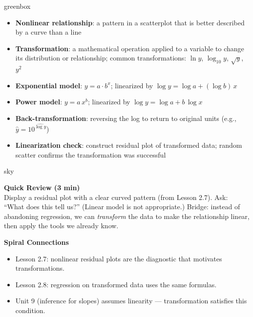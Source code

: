 \documentclass[10pt]{article}
\begin{document}
\begin{skillbox}{greenbox}
\begin{minipage}[t]{0.48\linewidth}
    \begin{itemize}
        \item \textbf{Nonlinear relationship}: a pattern in a scatterplot that is better described by a curve than a line
        \item \textbf{Transformation}: a mathematical operation applied to a variable to change its distribution or relationship; common transformations: $\ln y$, $\log_{10} y$, $\sqrt{y}$, $y^2$
        \item \textbf{Exponential model}: $y = a \cdot b^x$; linearized by $\log y = \log a + (\log b)\,x$
    \end{itemize}
\end{minipage}
\hfill
\begin{minipage}[t]{0.48\linewidth}
    \begin{itemize}
        \item \textbf{Power model}: $y = a\,x^b$; linearized by $\log y = \log a + b\,\log x$
        \item \textbf{Back-transformation}: reversing the log to return to original units (e.g., $\hat{y} = 10^{\widehat{\log y}}$)
        \item \textbf{Linearization check}: construct residual plot of transformed data; random scatter confirms the transformation was successful
    \end{itemize}
\end{minipage}
\end{skillbox}

\begin{skillbox}{sky}
\begin{minipage}[t]{0.48\linewidth}
    \textbf{Quick Review (3 min)}\\
    Display a residual plot with a clear curved pattern (from Lesson 2.7). Ask: ``What does this tell us?'' (Linear model is not appropriate.) Bridge: instead of abandoning regression, we can \textit{transform} the data to make the relationship linear, then apply the tools we already know.
\end{minipage}
\hfill
\begin{minipage}[t]{0.48\linewidth}
    \textbf{Spiral Connections}
    \begin{itemize}
        \item Lesson 2.7: nonlinear residual plots are the diagnostic that motivates transformations.
        \item Lesson 2.8: regression on transformed data uses the same formulas.
        \item Unit 9 (inference for slopes) assumes linearity --- transformation satisfies this condition.
    \end{itemize}
\end{minipage}
\end{skillbox}
\end{document}
